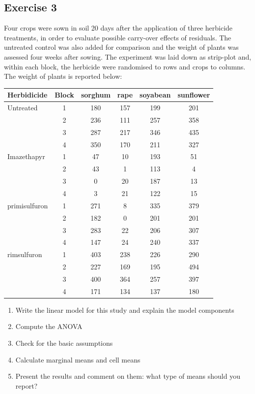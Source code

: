 \documentclass[a4paper,12pt,oneside]{book}
\providecommand{\tightlist}{%
  \setlength{\itemsep}{0pt}\setlength{\parskip}{0pt}}
\begin{document}
\hypertarget{exercise-3-5}{%
\subsection{Exercise 3}\label{exercise-3-5}}

Four crops were sown in soil 20 days after the application of three herbicide treatments, in order to evaluate possible carry-over effects of residuals. The untreated control was also added for comparison and the weight of plants was assessed four weeks after sowing. The experiment was laid down as strip-plot and, within each block, the herbicide were randomised to rows and crops to columns. The weight of plants is reported below:

\begin{longtable}[]{@{}lccccc@{}}
\toprule
Herbidicide & Block & sorghum & rape & soyabean & sunflower \\
\midrule
\endhead
Untreated & 1 & 180 & 157 & 199 & 201 \\
& 2 & 236 & 111 & 257 & 358 \\
& 3 & 287 & 217 & 346 & 435 \\
& 4 & 350 & 170 & 211 & 327 \\
Imazethapyr & 1 & 47 & 10 & 193 & 51 \\
& 2 & 43 & 1 & 113 & 4 \\
& 3 & 0 & 20 & 187 & 13 \\
& 4 & 3 & 21 & 122 & 15 \\
primisulfuron & 1 & 271 & 8 & 335 & 379 \\
& 2 & 182 & 0 & 201 & 201 \\
& 3 & 283 & 22 & 206 & 307 \\
& 4 & 147 & 24 & 240 & 337 \\
rimsulfuron & 1 & 403 & 238 & 226 & 290 \\
& 2 & 227 & 169 & 195 & 494 \\
& 3 & 400 & 364 & 257 & 397 \\
& 4 & 171 & 134 & 137 & 180 \\
\bottomrule
\end{longtable}

\begin{enumerate}
\def\labelenumi{\arabic{enumi}.}
\tightlist
\item
  Write the linear model for this study and explain the model components
\item
  Compute the ANOVA
\item
  Check for the basic assumptions
\item
  Calculate marginal means and cell means
\item
  Present the results and comment on them: what type of means should you report?
\end{enumerate}
\end{document}
